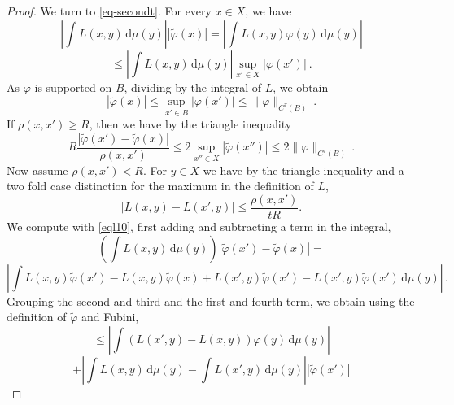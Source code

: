 {\begin{proof}
We turn to \eqref{eq-secondt}. For every $x\in X$, we have
\begin{equation}
    \left|\int L(x,y) \, \mathrm{d}\mu(y)\right||\tilde{\varphi}(x)|
    =\left|\int L(x,y) {\varphi}(y)\, \mathrm{d}\mu(y)\right|
\end{equation}
 \begin{equation}
    \le \left|\int L(x,y) \, \mathrm{d}\mu(y)\right| \sup_{x'\in X}
    |{\varphi}(x')|\ .
\end{equation}
As $\varphi$ is supported on $B$, dividing by the integral of $L$, we obtain
\begin{equation}\label{eql42}
 |\tilde{\varphi}(x)|\le \sup_{x'\in B}
    |{\varphi}(x')|\le \|\varphi\|_{C^\tau(B)}\ .
\end{equation}
If $\rho(x,x')\ge R$, then we have by the triangle inequality
  \begin{equation}\label{eql52}
 R\frac{|\tilde{\varphi}(x') - \tilde \varphi(x)|}{\rho(x,x')} \le
 2\sup_{x''\in X} |\tilde{\varphi}(x'')|\le 2\|\varphi\|_{C^\tau(B)}\, .
\end{equation}
Now assume  $\rho(x,x')< R$. For $y\in X$ we have by the triangle inequality and a two fold case distinction
for the maximum in the definition of $L$,
\begin{equation}\label{eql10}
   |L(x,y) - L(x',y)| \le \frac{\rho(x,x')}{tR}.
\end{equation}
We compute with \eqref{eql10}, first adding and subtracting a term in the integral,
\begin{equation}
    \left(\int L(x,y) \, \mathrm{d}\mu(y)\right)
    |\tilde{\varphi}(x') - \tilde \varphi(x)|=
\end{equation}
\begin{equation}
    \left|\int L(x,y) \tilde{\varphi}(x')
    -L(x,y) \tilde{\varphi}(x)
    +L(x',y) \tilde{\varphi}(x')-
     L(x',y) \tilde{\varphi}(x')
    \, \mathrm{d}\mu(y)\right|\,.
\end{equation}
Grouping the second and third and the first and fourth term, we obtain using the definition of $\tilde \varphi$ and Fubini,
\begin{equation}\label{eql21}
    \le  \left| \int (L(x',y)-L(x,y)) \varphi(y) \, \mathrm{d}\mu(y)\right|
\end{equation}
\begin{equation}\label{eql22}
    +  \left| \int L(x,y)  \, \mathrm{d}\mu(y)-\int L(x',y)  \, \mathrm{d}\mu(y)\right||\tilde{\varphi}(x')|
\end{equation}
\begin{equation}\label{eql23}

\end{equation}
\end{proof}}
